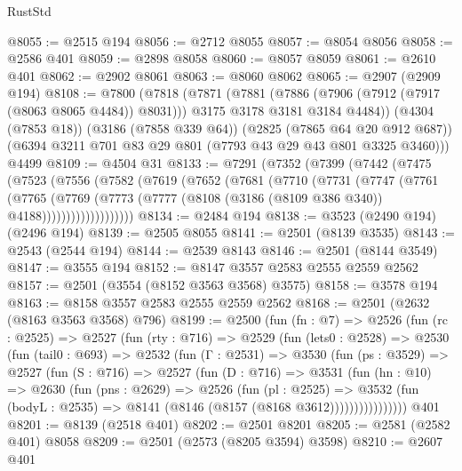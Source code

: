 \begin{lexlean}{RustStd}
\begin{coremodule}
{\begin{coremodule}
{{{{{{{{{{{{{{{{{{{{@8055 := @2515 @194
@8056 := @2712 @8055
@8057 := @8054 @8056
@8058 := @2586 @401
@8059 := @2898 @8058
@8060 := @8057 @8059
@8061 := @2610 @401
@8062 := @2902 @8061
@8063 := @8060 @8062
@8065 := @2907 (@2909 @194)
@8108 := @7800
    (@7818
      (@7871
        (@7881
          (@7886 (@7906 (@7912 (@7917 (@8063 @8065 @4484)) @8031)))
          @3175
          @3178
          @3181
          @3184
          @4484))
      (@4304 (@7853 @18))
      (@3186 (@7858 @339 @64))
      (@2825 (@7865 @64 @20 @912 @687))
      (@6394 @3211 @701 @83 @29 @801 (@7793 @43 @29 @43 @801 @3325 @3460)))
    @4499
@8109 := @4504 @31
@8133 := @7291
    (@7352
      (@7399
        (@7442
          (@7475
            (@7523
              (@7556
                (@7582
                  (@7619
                    (@7652
                      (@7681
                        (@7710
                          (@7731
                            (@7747
                              (@7761
                                (@7765
                                  (@7769
                                    (@7773
                                      (@7777
                                        (@8108 (@3186 (@8109 @386 @340)) @4188)))))))))))))))))))
@8134 := @2484 @194
@8138 := @3523 (@2490 @194) (@2496 @194)
@8139 := @2505 @8055
@8141 := @2501 (@8139 @3535)
@8143 := @2543 (@2544 @194)
@8144 := @2539 @8143
@8146 := @2501 (@8144 @3549)
@8147 := @3555 @194
@8152 := @8147 @3557 @2583 @2555 @2559 @2562
@8157 := @2501 (@3554 (@8152 @3563 @3568) @3575)
@8158 := @3578 @194
@8163 := @8158 @3557 @2583 @2555 @2559 @2562
@8168 := @2501 (@2632 (@8163 @3563 @3568) @796)
@8199 := @2500
    (fun (fn : @7) =>
    @2526
      (fun (rc : @2525) =>
      @2527
        (fun (rty : @716) =>
        @2529
          (fun (lets0 : @2528) =>
          @2530
            (fun (tail0 : @693) =>
            @2532
              (fun (Γ : @2531) =>
              @3530
                (fun (ps : @3529) =>
                @2527
                  (fun (S : @716) =>
                  @2527
                    (fun (D : @716) =>
                    @3531
                      (fun (hn : @10) =>
                      @2630
                        (fun (pns : @2629) =>
                        @2526
                          (fun (pl : @2525) =>
                          @3532
                            (fun (bodyL : @2535) => @8141 (@8146 (@8157 (@8168 @3612))))))))))))))))
    @401
@8201 := @8139 (@2518 @401)
@8202 := @2501 @8201
@8205 := @2581 (@2582 @401) @8058
@8209 := @2501 (@2573 (@8205 @3594) @3598)
@8210 := @2607 @401
}}}}}}}}}}}}}}}}}}}}
\end{coremodule}}
\end{coremodule}
\end{lexlean}
